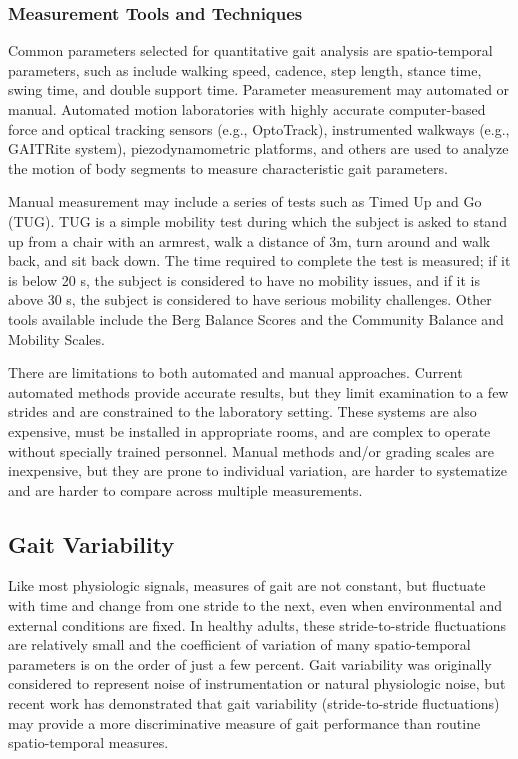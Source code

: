 \documentclass[11pt, oneside]{report}
\begin{document}
\subsubsection{Measurement Tools and Techniques}

Common parameters selected for quantitative gait analysis are spatio-temporal parameters, such as include walking speed, cadence, step length, stance time, swing time, and double support time\cite{Mudge2007}. Parameter measurement may automated or manual. Automated motion laboratories with highly accurate computer-based force and optical tracking sensors (e.g., OptoTrack), instrumented walkways (e.g., GAITRite system), piezodynamometric platforms, and others are used to analyze the motion of body segments to measure characteristic gait parameters\cite{Khusainov2013}. 

Manual measurement may include a series of tests such as Timed Up and Go (TUG)\cite{Khusainov2013}. TUG is a simple mobility test during which the subject is asked to stand up from a chair with an armrest, walk a distance of 3m, turn around and walk back, and sit back down\cite{Herman2011}. The time required to complete the test is measured; if it is below 20 s, the subject is considered to have no mobility issues, and if it is above 30 s, the subject is considered to have serious mobility challenges. Other tools available include the Berg Balance Scores and the Community Balance and Mobility Scales\cite{Steffen2002a}.

There are limitations to both automated and manual approaches. Current automated methods provide accurate results, but they limit examination to a few strides and are constrained to the laboratory setting. These systems are also expensive, must be installed in appropriate rooms, and are complex to operate without specially trained personnel\cite{SantAnna2009}. Manual methods and/or grading scales are inexpensive, but they are prone to individual variation, are harder to systematize and are harder to compare across multiple measurements\cite{Khusainov2013}.

\subsection{Gait Variability}

Like most physiologic signals, measures of gait are not constant, but fluctuate with time and change from one stride to the next, even when environmental and external conditions are fixed\cite{Hausdorff2005}. In healthy adults, these stride-to-stride fluctuations are relatively small and the coefficient of variation of many spatio-temporal parameters is on the order of just a few percent\cite{Gabell1984}. Gait variability was originally considered to represent noise of instrumentation or natural physiologic noise, but recent work has demonstrated that gait variability (stride-to-stride fluctuations) may provide a more discriminative measure of gait performance than routine spatio-temporal measures\cite{Lord2011}.
\end{document}
